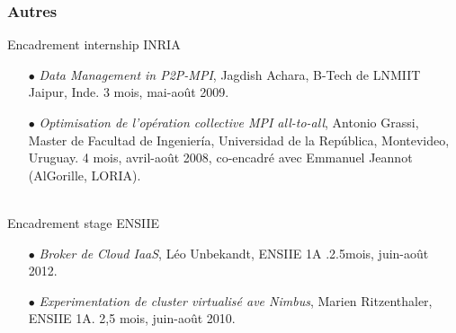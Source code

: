 \documentclass[11pt]{article}
\begin{document}
\subsubsection{Autres}
Encadrement internship INRIA
\smallskip
\begin{itemize}
\item[$\bullet$]  {\it Data Management in P2P-MPI}, Jagdish Achara, B-Tech de 
LNMIIT Jaipur, Inde. 3 mois, mai-août 2009. 
\item[$\bullet$]  {\it Optimisation de l'opération collective MPI all-to-all}, 
Antonio Grassi, Master de Facultad de Ingeniería, Universidad de la República, 
Montevideo, Uruguay. 4 mois, avril-août 2008, co-encadré avec Emmanuel Jeannot 
(AlGorille, LORIA).
\end{itemize}
~\\
Encadrement stage ENSIIE
\smallskip
\begin{itemize}
\item[$\bullet$] {\it Broker de Cloud  IaaS}, Léo Unbekandt, ENSIIE 1A .2.5mois,
  juin-août 2012.
\item[$\bullet$]  {\it Experimentation de cluster virtualisé ave Nimbus}, 
Marien Ritzenthaler, ENSIIE 1A. 2,5 mois, juin-août 2010. 
\end{itemize}
~\\
\end{document}
